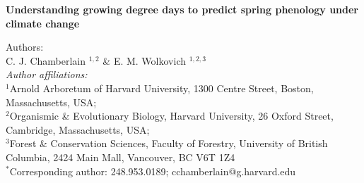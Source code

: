 \documentclass{article}\usepackage[]{graphicx}\usepackage[]{color}
\begin{document}
\noindent\textbf{\Large{Understanding growing degree days to predict spring phenology under climate change}}

\noindent Authors:\\
C. J. Chamberlain $^{1,2}$ \& E. M. Wolkovich $^{1,2,3}$
\vspace{2ex}\\
\emph{Author affiliations:}\\
$^{1}$Arnold Arboretum of Harvard University, 1300 Centre Street, Boston, Massachusetts, USA; \\
$^{2}$Organismic \& Evolutionary Biology, Harvard University, 26 Oxford Street, Cambridge, Massachusetts, USA; \\
$^{3}$Forest \& Conservation Sciences, Faculty of Forestry, University of British Columbia, 2424 Main Mall, Vancouver, BC V6T 1Z4\\
\vspace{2ex}
$^*$Corresponding author: 248.953.0189; cchamberlain@g.harvard.edu\\

\renewcommand{\thetable}{\arabic{table}}
\renewcommand{\thefigure}{\arabic{figure}}
\renewcommand{\labelitemi}{$-$}

\end{document}
